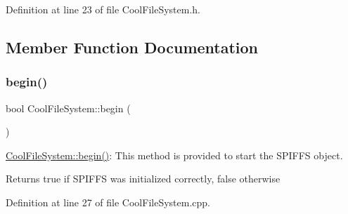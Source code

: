 Definition at line 23 of file Cool\+File\+System.\+h.



\subsection{Member Function Documentation}
\mbox{\label{class_cool_file_system_a6ba6f666ed4c530174f8569d2c636748}} 
\subsubsection{\texorpdfstring{begin()}{begin()}}
{\footnotesize\ttfamily bool Cool\+File\+System\+::begin (\begin{DoxyParamCaption}{ }\end{DoxyParamCaption})}

\hyperlink{class_cool_file_system_a6ba6f666ed4c530174f8569d2c636748}{Cool\+File\+System\+::begin()}\+: This method is provided to start the S\+P\+I\+F\+FS object.

\begin{DoxyReturn}{Returns}
true if S\+P\+I\+F\+FS was initialized correctly, false otherwise 
\end{DoxyReturn}


Definition at line 27 of file Cool\+File\+System.\+cpp.


